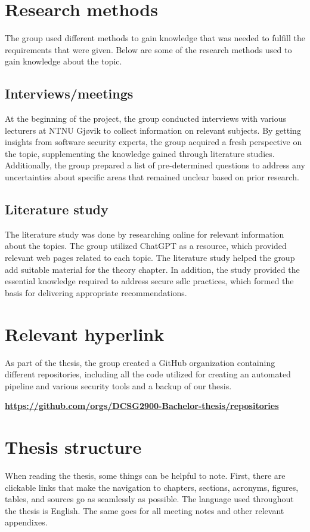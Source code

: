 \section{Research methods}
The group used different methods to gain knowledge that was needed to fulfill the requirements that were given. Below are some of the research methods used to gain knowledge about the topic. 

\subsection{Interviews/meetings}
At the beginning of the project, the group conducted interviews with various lecturers at NTNU Gjøvik to collect information on relevant subjects. By getting insights from software security experts, the group acquired a fresh perspective on the topic, supplementing the knowledge gained through literature studies. Additionally, the group prepared a list of pre-determined questions to address any uncertainties about specific areas that remained unclear based on prior research.  

\subsection{Literature study}
The literature study was done by researching online for relevant information about the topics. The group utilized ChatGPT as a resource, which provided relevant web pages related to each topic. The literature study helped the group add suitable material for the theory chapter. In addition, the study provided the essential knowledge required to address secure \acrshort{sdlc} practices, which formed the basis for delivering appropriate recommendations.

\section{Relevant hyperlink}
As part of the thesis, the group created a GitHub organization containing different repositories, including all the code utilized for creating an automated pipeline and various security tools and a backup of our thesis. 

\href{https://github.com/orgs/DCSG2900-Bachelor-thesis/repositories}{\textbf{https://github.com/orgs/DCSG2900-Bachelor-thesis/repositories}}

\section{Thesis structure}
When reading the thesis, some things can be helpful to note. First, there are clickable links that make the navigation to chapters, sections, acronyms, figures, tables, and sources go as seamlessly as possible. The language used throughout the thesis is English. The same goes for all meeting notes and other relevant appendixes. 


